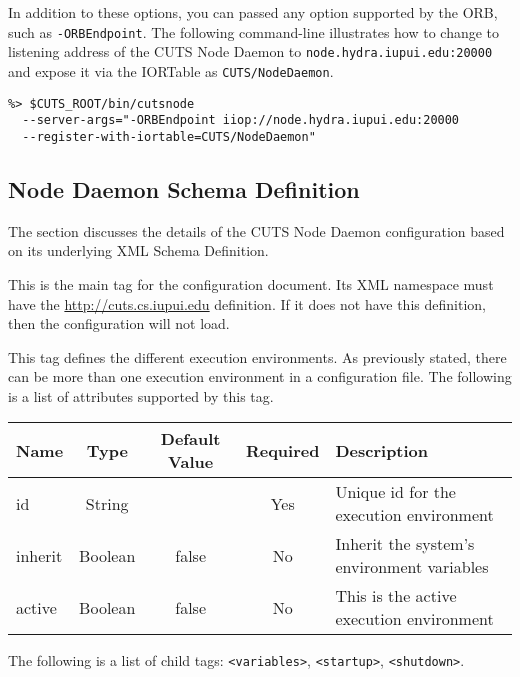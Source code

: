 In addition to these options, you can passed any option supported
by the ORB, such as \texttt{-ORBEndpoint}. The following command-line
illustrates how to change to listening address of the CUTS Node Daemon
to \texttt{node.hydra.iupui.edu:20000} and expose it via the IORTable
as \texttt{CUTS/NodeDaemon}.
\begin{lstlisting}
%> $CUTS_ROOT/bin/cutsnode 
  --server-args="-ORBEndpoint iiop://node.hydra.iupui.edu:20000
  --register-with-iortable=CUTS/NodeDaemon"
\end{lstlisting}

\subsection{Node Daemon Schema Definition}
\label{sec:node-daemon-schema}

The section discusses the details of the CUTS Node Daemon 
configuration based on its underlying XML Schema Definition.


This is the main tag for the configuration document. Its XML namespace
must have the \url{http://cuts.cs.iupui.edu} definition. If it does
not have this definition, then the configuration will not load.


This tag defines the different execution environments. As previously
stated, there can be more than one execution environment in a 
configuration file. The following is a list of attributes supported
by this tag.
\begin{table}[h]
  \begin{tabular}{lcccl}
  \hline
  \textbf{Name} & \textbf{Type} & \textbf{Default Value} & \textbf{Required} & \textbf{Description} \\
  \hline
  id & String  & & Yes & Unique id for the execution environment \\
  inherit & Boolean & false & No & Inherit the system's environment variables \\
  active & Boolean & false & No & This is the active execution environment \\
  \end{tabular}
\end{table}

\noindent The following is a list of child tags:
\texttt{<variables>}, \texttt{<startup>}, \texttt{<shutdown>}.


